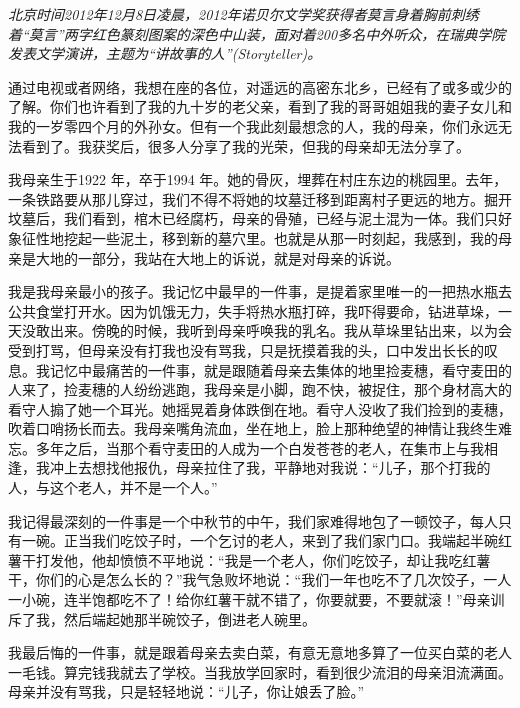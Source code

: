 \documentclass[fontset=fandol,12pt,a5paper]{ctexbook}
\begin{document}
\emph{北京时间2012年12月8日凌晨，2012年诺贝尔文学奖获得者莫言身着胸前刺绣着“莫言”两字红色篆刻图案的深色中山装，面对着200多名中外听众，在瑞典学院发表文学演讲，主题为“讲故事的人”(Storyteller)。}
\vspace{2em}


通过电视或者网络，我想在座的各位，对遥远的高密东北乡，已经有了或多或少的了解。你们也许看到了我的九十岁的老父亲，看到了我的哥哥姐姐我的妻子女儿和我的一岁零四个月的外孙女。但有一个我此刻最想念的人，我的母亲，你们永远无法看到了。我获奖后，很多人分享了我的光荣，但我的母亲却无法分享了。

我母亲生于1922 年，卒于1994 年。她的骨灰，埋葬在村庄东边的桃园里。去年，一条铁路要从那儿穿过，我们不得不将她的坟墓迁移到距离村子更远的地方。掘开坟墓后，我们看到，棺木已经腐朽，母亲的骨殖，已经与泥土混为一体。我们只好象征性地挖起一些泥土，移到新的墓穴里。也就是从那一时刻起，我感到，我的母亲是大地的一部分，我站在大地上的诉说，就是对母亲的诉说。

我是我母亲最小的孩子。我记忆中最早的一件事，是提着家里唯一的一把热水瓶去公共食堂打开水。因为饥饿无力，失手将热水瓶打碎，我吓得要命，钻进草垛，一天没敢出来。傍晚的时候，我听到母亲呼唤我的乳名。我从草垛里钻出来，以为会受到打骂，但母亲没有打我也没有骂我，只是抚摸着我的头，口中发出长长的叹息。我记忆中最痛苦的一件事，就是跟随着母亲去集体的地里捡麦穗，看守麦田的人来了，捡麦穗的人纷纷逃跑，我母亲是小脚，跑不快，被捉住，那个身材高大的看守人搧了她一个耳光。她摇晃着身体跌倒在地。看守人没收了我们捡到的麦穗，吹着口哨扬长而去。我母亲嘴角流血，坐在地上，脸上那种绝望的神情让我终生难忘。多年之后，当那个看守麦田的人成为一个白发苍苍的老人，在集市上与我相逢，我冲上去想找他报仇，母亲拉住了我，平静地对我说：“儿子，那个打我的人，与这个老人，并不是一个人。”

我记得最深刻的一件事是一个中秋节的中午，我们家难得地包了一顿饺子，每人只有一碗。正当我们吃饺子时，一个乞讨的老人，来到了我们家门口。我端起半碗红薯干打发他，他却愤愤不平地说：“我是一个老人，你们吃饺子，却让我吃红薯干，你们的心是怎么长的？”我气急败坏地说：“我们一年也吃不了几次饺子，一人一小碗，连半饱都吃不了！给你红薯干就不错了，你要就要，不要就滚！”母亲训斥了我，然后端起她那半碗饺子，倒进老人碗里。

我最后悔的一件事，就是跟着母亲去卖白菜，有意无意地多算了一位买白菜的老人一毛钱。算完钱我就去了学校。当我放学回家时，看到很少流泪的母亲泪流满面。母亲并没有骂我，只是轻轻地说：“儿子，你让娘丢了脸。”
\end{document}
